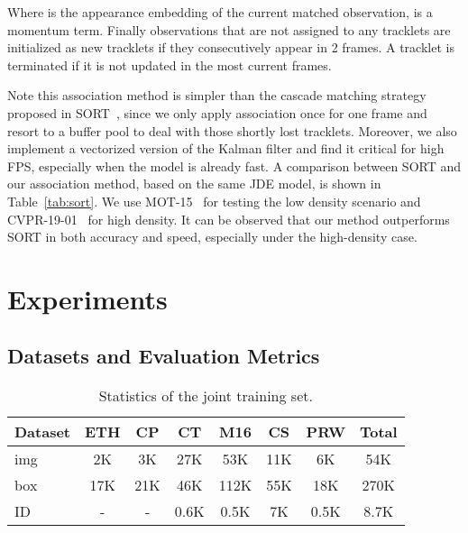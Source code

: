 \documentclass[runningheads]{llncs}
\begin{document}
Where  is the appearance embedding of the current matched observation,  is a momentum term. Finally observations that are not assigned to any tracklets are initialized as new tracklets if they consecutively appear in 2 frames. A tracklet is terminated if it is not updated in the most current  frames.



Note this association method is simpler than the cascade matching strategy proposed in SORT~\cite{sort}, since we only apply association once for one frame and resort to a buffer pool to deal with those shortly lost tracklets. Moreover, we also implement a vectorized version of the Kalman filter and find it critical for high FPS, especially when the model is already fast. A comparison between SORT and our association method, based on the same JDE model, is shown in Table~\ref{tab:sort}. We use MOT-15~\cite{mot16} for testing the low density scenario and CVPR-19-01~\cite{mot19} for high density. It can be observed that our method outperforms SORT in both accuracy and speed, especially under the high-density case.





\section{Experiments}
\subsection{Datasets and Evaluation Metrics}


\begin{wraptable}{R}{0.6\linewidth}

    \centering
    \begin{tabular}{l|ccccccc}
    \toprule
     Dataset& ETH & CP & CT & M16 & CS & PRW & Total \\
     \midrule
      img & 2K & 3K& 27K& 53K& 11K& 6K& 54K\\
      box & 17K& 21K& 46K& 112K& 55K& 18K& 270K\\
      ID & -& - & 0.6K & 0.5K& 7K& 0.5K& 8.7K\\
     \bottomrule
\end{tabular}
    \caption{Statistics of the joint training set.}
    \label{tab:dataset}
\end{wraptable}
\end{document}
